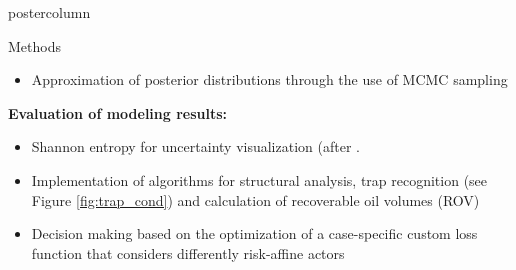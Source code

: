 \documentclass{beamer}
\begin{document}
\begin{frame}
\begin{columns}
\begin{column}{.382\textwidth}
\begin{beamercolorbox}[center]{postercolumn}
\begin{minipage}{.98\textwidth}
{\begin{myblock}{Methods}
\begin{itemize}
	\item Approximation of posterior distributions through the use of MCMC sampling
	\end{itemize}
\textbf{Evaluation of modeling results:}
	\begin{itemize}
	\item Shannon entropy for uncertainty visualization (after \citet{wellmann2012uncertainties}.
	\item Implementation of algorithms for structural analysis, trap recognition (see Figure \ref{fig:trap_cond}) and calculation of recoverable oil volumes (ROV)
	\item Decision making based on the optimization of a case-specific custom loss function that considers differently risk-affine actors
	\end{itemize}
	



\end{myblock}}
\end{minipage}
\end{beamercolorbox}
\end{column}
\end{columns}
\end{frame}
\end{document}
